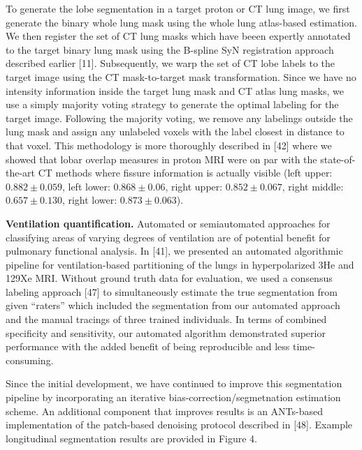\documentclass[11pt,]{article}
\begin{document}
To generate the lobe segmentation in a target proton or CT lung image,
we first generate the binary whole lung mask using the whole lung
atlas-based estimation. We then register the set of CT lung masks which
have beeen expertly annotated to the target binary lung mask using the
B-spline SyN registration approach described earlier {[}11{]}.
Subsequently, we warp the set of CT lobe labels to the target image
using the CT mask-to-target mask transformation. Since we have no
intensity information inside the target lung mask and CT atlas lung
masks, we use a simply majority voting strategy to generate the optimal
labeling for the target image. Following the majority voting, we remove
any labelings outside the lung mask and assign any unlabeled voxels with
the label closest in distance to that voxel. This methodology is more
thoroughly described in {[}42{]} where we showed that lobar overlap
measures in proton MRI were on par with the state-of-the-art CT methods
where fissure information is actually visible (left upper:
$0.882 \pm 0.059$, left lower: $0.868 \pm 0.06$, right upper:
$0.852 \pm 0.067$, right middle: $0.657 \pm 0.130$, right lower:
$0.873 \pm 0.063$).

\textbf{Ventilation quantification.} Automated or semiautomated
approaches for classifying areas of varying degrees of ventilation are
of potential benefit for pulmonary functional analysis. In {[}41{]}, we
presented an automated algorithmic pipeline for ventilation-based
partitioning of the lungs in hyperpolarized 3He and 129Xe MRI. Without
ground truth data for evaluation, we used a consensus labeling approach
{[}47{]} to simultaneously estimate the true segmentation from given
``raters'' which included the segmentation from our automated approach
and the manual tracings of three trained individuals. In terms of
combined specificity and sensitivity, our automated algorithm
demonstrated superior performance with the added benefit of being
reproducible and less time-consuming.

Since the initial development, we have continued to improve this
segmentation pipeline by incorporating an iterative
bias-correction/segmetnation estimation scheme. An additional component
that improves results is an ANTs-based implementation of the patch-based
denoising protocol described in {[}48{]}. Example longitudinal
segmentation results are provided in Figure 4.
\end{document}
